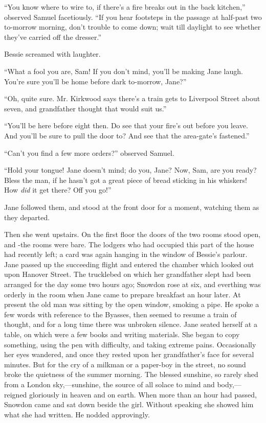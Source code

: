 ``You know where to wire to, if there's a fire breaks out in the back
kitchen,'' observed Samuel facetiously. ``If you hear footsteps {}in the
passage at half-past two to-morrow morning, don't trouble to come down;
wait till daylight to see whether they've carried off the dresser.''

Bessie screamed with laughter.

``What a fool you are, Sam! If you don't mind, you'll be making Jane
laugh. You're sure you'll be home before dark to-morrow, Jane?''

``Oh, quite sure. Mr. Kirkwood says there's a train gets to Liverpool
Street about seven, and grandfather thought that would suit us.''

``You'll be here before eight then. Do see that your fire's out before
you leave. And you'll be sure to pull the door to? And see that the
area-gate's fastened.''

``Can't you find a few more orders?'' observed Samuel.

``Hold your tongue! Jane doesn't mind; do you, Jane? Now, Sam, are you
ready? Bless the man, if he hasn't got a great piece of bread sticking
in his whiskers! How \emph{did} it get there? Off you go!''

{}Jane followed them, and stood at the front door for a moment, watching
them as they departed.

Then she went upstairs. On the first floor the doors of the two rooms
stood open, and -the rooms were bare. The lodgers who had occupied this
part of the house had recently left; a card was again hanging in the
window of Bessie's parlour. Jane passed up the succeeding flight and
entered the chamber which looked out upon Hanover Street. The trucklebed
on which her grandfather slept had been arranged for the day some two
hours ago; Snowdon rose at six, and everthing was orderly in the room
when Jane came to prepare breakfast an hour later. At present the old
man was sitting by the open window, smoking a pipe. He spoke a few words
with reference to the Byasses, then seemed to resume a train of thought,
and for a long time there was unbroken silence. Jane seated herself at a
table, on which were a few books and writing materials. She began to
copy something, using the pen with difficulty, and taking extreme
{}pains. Occasionally her eyes wandered, and once they rested upon her
grandfather's face for several minutes. But for the cry of a milkman or
a paper-boy in the street, no sound broke the quietness of the summer
morning. The blessed sunshine, so rarely shed from a London
sky,---sunshine, the source of all solace to mind and body,---reigned
gloriously in heaven and on earth. When more than an hour had passed,
Snowdon came and sat down beside the girl. Without speaking she showed
him what she had written. He nodded approvingly.

